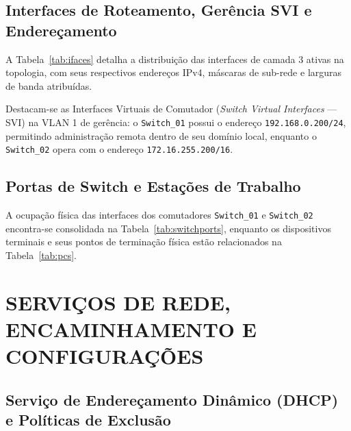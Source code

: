 \subsection{Interfaces de Roteamento, Gerência SVI e Endereçamento}

A Tabela~\ref{tab:ifaces} detalha a distribuição das interfaces de camada 3 ativas na topologia, com seus respectivos endereços IPv4, máscaras de sub-rede e larguras de banda atribuídas.

\begin{table}[H]
\centering
\small

\caption{Interfaces de Camada 3 e interfaces virtuais de comutador (SVIs).}
\label{tab:ifaces}
\end{table}

Destacam-se as Interfaces Virtuais de Comutador (\textit{Switch Virtual Interfaces} --- SVI) na VLAN 1 de gerência: o \texttt{Switch\_01} possui o endereço \texttt{192.168.0.200/24}, permitindo administração remota dentro de seu domínio local, enquanto o \texttt{Switch\_02} opera com o endereço \texttt{172.16.255.200/16}.

\subsection{Portas de Switch e Estações de Trabalho}

A ocupação física das interfaces dos comutadores \texttt{Switch\_01} e \texttt{Switch\_02} encontra-se consolidada na Tabela~\ref{tab:switchports}, enquanto os dispositivos terminais e seus pontos de terminação física estão relacionados na Tabela~\ref{tab:pcs}.

\begin{table}[H]
\centering
\small

\caption{Mapeamento posicional de portas dos comutadores Cisco Catalyst 2960.}
\label{tab:switchports}
\end{table}

\begin{table}[H]
\centering
\small

\caption{Dispositivos finais conectados à infraestrutura.}
\label{tab:pcs}
\end{table}

\section{SERVIÇOS DE REDE, ENCAMINHAMENTO E CONFIGURAÇÕES}

\subsection{Serviço de Endereçamento Dinâmico (DHCP) e Políticas de Exclusão}

